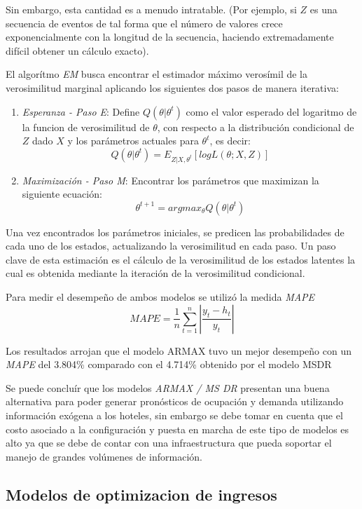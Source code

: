 {Sin embargo, esta cantidad es a menudo intratable. (Por ejemplo, si $Z$ es una secuencia de eventos de tal forma que el número de valores crece exponencialmente con la longitud de la secuencia, haciendo extremadamente difícil obtener un cálculo exacto).

El algorítmo \emph{EM} busca encontrar el estimador máximo verosímil de la verosimilitud marginal aplicando los siguientes dos pasos de manera iterativa:

\begin{enumerate}
  \item \emph{Esperanza - Paso E}: Define $Q(\theta|\theta^t)$ como el valor esperado del logaritmo de la funcion de verosimilitud de $\theta$, con respecto a la distribución condicional de $Z$ dado $X$ y los parámetros actuales para $\theta^t$, es decir: $$Q(\theta|\theta^t) = E_{Z|X,\theta^t}[log L(\theta;X,Z)]$$
  \item \emph{Maximización - Paso M}: Encontrar los parámetros que maximizan la siguiente ecuación: $$\theta^{t+1} = argmax_\theta Q(\theta|\theta^t)$$
\end{enumerate}


Una vez encontrados los parámetros iniciales, se predicen las probabilidades de cada uno de los estados, actualizando la verosimilitud en cada paso. Un paso clave de esta estimación es el cálculo de la verosimilitud de los estados latentes la cual es obtenida mediante la iteración de la verosimilitud condicional.

Para medir el desempeño de ambos modelos se utilizó la medida \emph{MAPE} $$MAPE=\frac{1}{n}\sum_{t=1}^{n}|\frac{y_t-h_t}{y_t}|$$ 

Los resultados arrojan que el modelo ARMAX tuvo un mejor desempeño con un \emph{MAPE} del 3.804\% comparado con el 4.714\% obtenido por el modelo MSDR

Se puede concluír que los modelos \emph{ARMAX / MS DR} presentan una buena alternativa para poder generar pronósticos de ocupación y demanda utilizando información exógena a los hoteles, sin embargo se debe tomar en cuenta que el costo asociado a la configuración y puesta en marcha de este tipo de modelos es alto ya que se debe de contar con una infraestructura que pueda soportar el manejo de grandes volúmenes de información.


\subsection*{Modelos de optimizacion de ingresos}

}

